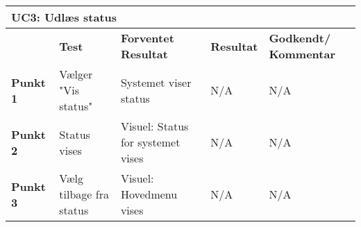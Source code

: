 \begin{table}[htbp] \centering
\begin{tabular}{|p{}|p{}|p{3cm}|p{3cm}|p{3cm}|} %
	\hline
\multicolumn{5}{|l|}{\textbf{UC3: Udlæs status}} \\\hline
	&\textbf{Test} &\textbf{Forventet \newline Resultat} &\textbf{Resultat} &\textbf{Godkendt/ \newline Kommentar} \\\hline
\textbf{Punkt 1} &
Vælger "Vis status" &
Systemet viser status &
N/A &
N/A \\\hline
\textbf{Punkt 2} &
Status vises &
Visuel: Status for systemet vises &
N/A &
N/A \\\hline
\textbf{Punkt 3} &
Vælg tilbage fra status &
Visuel: Hovedmenu vises &
N/A &
N/A \\\hline
	\end{tabular}
	\label{ATUC3} 
\end{table}